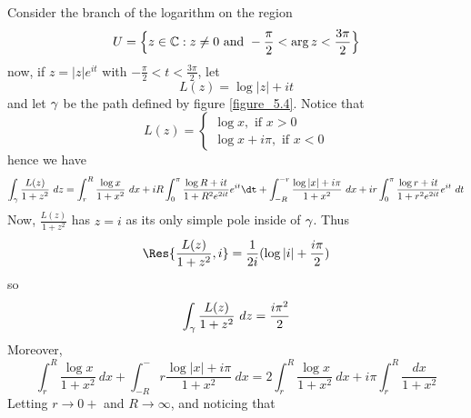 \begin{example}
\begin{enumerate}
          Consider the branch of the logarithm on the region
          \begin{equation*}
              U=\Big{\{} z \in \mathbb{C} : z \neq 0 \text{ and }
              -\frac{\pi}{2}<\arg{z}<\frac{3\pi}{2} \Big{\}}
          \end{equation*}
          now, if $z=|z|e^{it}$ with $-\frac{\pi}{2}<t<\frac{3\pi}{2}$, let
          \begin{equation*}
              L(z)=\log{|z|}+it
          \end{equation*}
          and let $\gamma$ be the path defined by figure \ref{figure_5.4}. Notice
          that
          \begin{equation*}
              L(z)=\begin{cases}
                        \log{x}, \text{ if } x>0    \\
                        \log{x}+i\pi, \text{ if } x<0
                  \end{cases}
          \end{equation*}
          hence we have
          \begin{equation*}
              \int_\y{\frac{L(z)}{1+z^2} \ dz}=
              \int_r^R{\frac{\log{x}}{1+x^2} \ dx}+
              iR\int_0^\pi{\frac{\log{R}+it}{1+R^2e^{2it}}e^{it} \dt}+
              \int_{-R}^{-r}{\frac{\log{|x|+i\pi}}{1+x^2} \ dx}+
              ir\int_0^\pi{\frac{\log{r}+it}{1+r^2e^{2it}}e^{it} \ dt}
          \end{equation*}
          Now, $\frac{L(z)}{1+z^2}$ has $z=i$ as its only simple pole inside of
           $\gamma$. Thus
           \begin{equation*}
               \Res{\frac{L(z)}{1+z^2},i}=\frac{1}{2i}(\log{|i|+\frac{i\pi}{2}})
           \end{equation*}
           so
           \begin{equation*}
               \int_\y{\frac{L(z)}{1+z^2} \ dz}=\frac{i\pi^2}{2}
           \end{equation*}
           Moreover,
           \begin{equation*}
               \int_r^R{\frac{\log{x}}{1+x^2} \ dx}+
               \int_{-R}^-r{\frac{\log{|x|+i\pi}}{1+x^2} \ dx}=
               2\int_r^R{\frac{\log{x}}{1+x^2} \
               dx}+i\pi\int_r^R{\frac{dx}{1+x^2}}
           \end{equation*}
           Letting $r \xrightarrow{} 0+$ and $R \xrightarrow{} \infty$, and
           noticing that
           \begin{equation*}

\end{equation*}
\end{enumerate}
\end{example}
